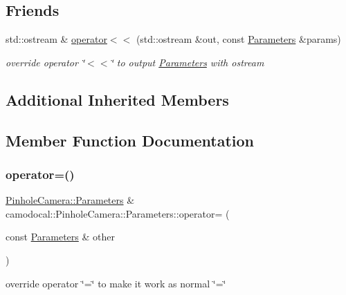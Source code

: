 \subsection*{Friends}
\begin{DoxyCompactItemize}
\item 
std\+::ostream \& \hyperlink{classcamodocal_1_1PinholeCamera_1_1Parameters_a392b64d625819770f4efedc75838cc42}{operator$<$$<$} (std\+::ostream \&out, const \hyperlink{classcamodocal_1_1PinholeCamera_1_1Parameters}{Parameters} \&params)
\begin{DoxyCompactList}\small\item\em override operator \char`\"{}$<$$<$\char`\"{} to output \hyperlink{classcamodocal_1_1PinholeCamera_1_1Parameters}{Parameters} with ostream \end{DoxyCompactList}\end{DoxyCompactItemize}
\subsection*{Additional Inherited Members}


\subsection{Member Function Documentation}
\mbox{\label{classcamodocal_1_1PinholeCamera_1_1Parameters_a9a13d3d054304a31cb96e75c65a806c4}} 
\subsubsection{\texorpdfstring{operator=()}{operator=()}}
{\footnotesize\ttfamily \hyperlink{classcamodocal_1_1PinholeCamera_1_1Parameters}{Pinhole\+Camera\+::\+Parameters} \& camodocal\+::\+Pinhole\+Camera\+::\+Parameters\+::operator= (\begin{DoxyParamCaption}\item[{const \hyperlink{classcamodocal_1_1PinholeCamera_1_1Parameters}{Parameters} \&}]{other }\end{DoxyParamCaption})}



override operator \char`\"{}=\char`\"{} to make it work as normal \char`\"{}=\char`\"{} 


